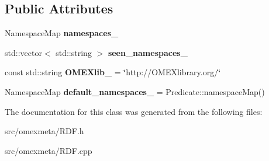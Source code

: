 \subsection*{Public Attributes}
\begin{DoxyCompactItemize}
\item 
\mbox{\label{classomexmeta_1_1RDF_a1979d7d70a4c20f2e63f00c7fa668b1f}} 
Namespace\+Map {\bfseries namespaces\+\_\+}
\item 
\mbox{\label{classomexmeta_1_1RDF_a82bc53feb93e1243970400fd104174da}} 
std\+::vector$<$ std\+::string $>$ {\bfseries seen\+\_\+namespaces\+\_\+}
\item 
\mbox{\label{classomexmeta_1_1RDF_a59014bbb45a43dbfa760480f1713c473}} 
const std\+::string {\bfseries O\+M\+E\+Xlib\+\_\+} = \char`\"{}http\+://O\+M\+E\+Xlibrary.\+org/\char`\"{}
\item 
\mbox{\label{classomexmeta_1_1RDF_a5b1184955f2401c30116c7473be1ca1d}} 
Namespace\+Map {\bfseries default\+\_\+namespaces\+\_\+} = Predicate\+::namespace\+Map()
\end{DoxyCompactItemize}


The documentation for this class was generated from the following files\+:\begin{DoxyCompactItemize}
\item 
src/omexmeta/R\+D\+F.\+h\item 
src/omexmeta/R\+D\+F.\+cpp\end{DoxyCompactItemize}
